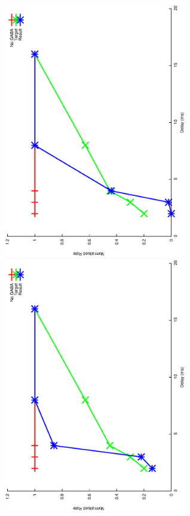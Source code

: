 \documentclass{article}
\begin{document}
\includegraphics[keepaspectratio=true,angle=-90,width=0.6\textwidth]{DS_ClickRecovery_result.37.eps}\clearpage
\includegraphics[keepaspectratio=true,angle=-90,width=0.6\textwidth]{DS_ClickRecovery_result.38.eps}\clearpage
\end{document}
